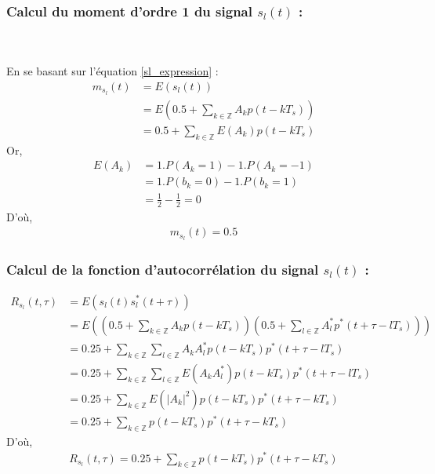\documentclass{rapport}
\begin{document}
{\subsubsection{\large Calcul du moment d'ordre 1 du signal $s_l(t)$ :}
\\\\
En se basant sur l'équation \eqref{sl_expression} :
$$
\begin{align}
m_{s_l}(t) &= E(s_l(t))\\
           &= E(0.5 +\sum\limits_{k \in \mathbb{Z}} A_k p(t - kT_s))\\
           &= 0.5 + \sum\limits_{k \in \mathbb{Z}} E(A_k) p(t - kT_s)
\end{align}
$$
Or,
$$
\begin{align}
E(A_k) &= 1 . P(A_k = 1) - 1 . P(A_k = -1)\\
       &= 1 . P(b_k = 0) - 1 . P(b_k = 1)\\
       &= \frac{1}{2} - \frac{1}{2} = 0
\end{align}
$$
D'où,
\begin{align}
    m_{s_l}(t) = 0.5
\end{align}

\subsubsection{\large Calcul de la fonction d'autocorrélation du signal $s_l(t)$ :}
$$
\begin{align}
R_{s_l}(t, \tau) &= E(s_l(t)s_l^*(t + \tau))\\
                 &= E((0.5 +\sum\limits_{k \in \mathbb{Z}} A_k p(t - kT_s))(0.5 +\sum\limits_{l \in \mathbb{Z}} A_l^* p^*(t + \tau - lT_s)))\\
                 &= 0.25 + \sum\limits_{k \in \mathbb{Z}}\sum\limits_{l \in \mathbb{Z}} A_k A_l^*p(t - kT_s)p^*(t + \tau - lT_s)\\
                 &= 0.25 + \sum\limits_{k \in \mathbb{Z}}\sum\limits_{l \in \mathbb{Z}} E(A_kA_l^*)p(t - kT_s)p^*(t + \tau - lT_s)\\
                 &= 0.25 + \sum\limits_{k \in \mathbb{Z}}E(\lvert A_k \rvert ^2)p(t - kT_s)p^*(t + \tau - kT_s)\\
                 &= 0.25 + \sum\limits_{k \in \mathbb{Z}}p(t - kT_s)p^*(t + \tau - kT_s)
\end{align}
$$
D'où,
\begin{align}
    R_{s_l}(t, \tau) = 0.25 + \sum\limits_{k \in \mathbb{Z}}p(t - kT_s)p^*(t + \tau - kT_s)
\end{align}


}
\end{document}
